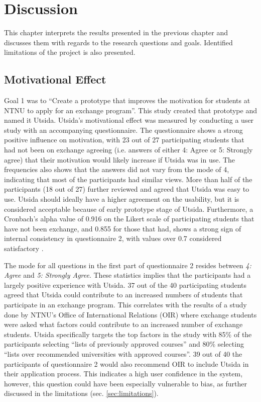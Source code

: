 \chapter{Discussion}

This chapter interprets the results presented in the previous chapter and discusses them with regards to the research questions and goals. Identified limitations of the project is also presented.

\section{Motivational Effect}

Goal 1 was to \enquote{Create a prototype that improves the motivation for students at NTNU to apply for an exchange program}. This study created that prototype and named it Utsida. Utsida's motivational effect was measured by conducting a user study with an accompanying questionnaire. The questionnaire shows a strong positive influence on motivation, with 23 out of 27 participating students that had not been on exchange agreeing (i.e. answers of either 4: Agree or 5: Strongly agree) that their motivation would likely increase if Utsida was in use. The frequencies also shows that the answers did not vary from the mode of 4, indicating that most of the participants had similar views. More than half of the participants (18 out of 27) further reviewed and agreed that Utsida was easy to use. Utsida should ideally have a higher agreement on the usability, but it is considered acceptable because of early prototype stage of Utsida. Furthermore, a Cronbach's alpha value of 0.916 on the Likert scale of participating students that have not been exchange, and 0.855 for those that had, shows a strong sign of internal consistency in questionnaire 2, with values over 0.7 considered satisfactory \cite{bland1997statistics}.

The mode for all questions in the first part of questionnaire 2 resides between \textit{4: Agree} and \textit{5: Strongly Agree}. These statistics implies that the participants had a largely positive experience with Utsida. 37 out of the 40 participating students agreed that Utsida could contribute to an increased numbers of students that participate in an exchange program. This correlates with the results of a study done by NTNU's Office of International Relations (OIR) \cite{intersek_report} where exchange students were asked what factors could contribute to an increased number of exchange students. Utsida specifically targets the top factors in the study with 85\% of the participants selecting \enquote{lists of previously approved courses} and 80\% selecting \enquote{lists over recommended universities with approved courses}. 39 out of 40 the participants of questionnaire 2 would also recommend OIR to include Utsida in their application process. This indicates a high user confidence in the system, however, this question could have been especially vulnerable to bias, as further discussed in the limitations (sec. \ref{sec:limitations}).

